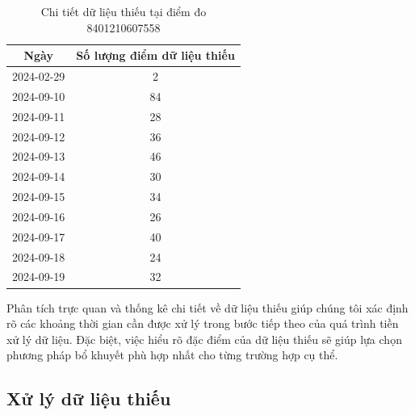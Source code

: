 \begin{table}[htbp]
\centering
{}
\caption{Tóm tắt dữ liệu thiếu tại điểm đo 841211914190}
\label{tab:missing_data_841211914190}
\end{table}

\begin{table}[htbp]
\centering
\begin{tabular}{|c|c|}
\hline
\textbf{Ngày} & \textbf{Số lượng điểm dữ liệu thiếu} \\
\hline
2024-02-29 & 2 \\
\hline
2024-09-10 & 84 \\
\hline
2024-09-11 & 28 \\
\hline
2024-09-12 & 36 \\
\hline
2024-09-13 & 46 \\
\hline
2024-09-14 & 30 \\
\hline
2024-09-15 & 34 \\
\hline
2024-09-16 & 26 \\
\hline
2024-09-17 & 40 \\
\hline
2024-09-18 & 24 \\
\hline
2024-09-19 & 32 \\
\hline
\end{tabular}
\caption{Chi tiết dữ liệu thiếu tại điểm đo 8401210607558}
\label{tab:missing_data_8401210607558}
\end{table}

Phân tích trực quan và thống kê chi tiết về dữ liệu thiếu giúp chúng tôi xác định rõ các khoảng thời gian cần được xử lý trong bước tiếp theo của quá trình tiền xử lý dữ liệu. Đặc biệt, việc hiểu rõ đặc điểm của dữ liệu thiếu sẽ giúp lựa chọn phương pháp bổ khuyết phù hợp nhất cho từng trường hợp cụ thể.

\subsection{Xử lý dữ liệu thiếu}
